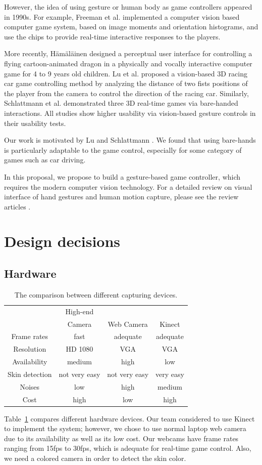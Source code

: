 \documentclass[10pt,twocolumn,letterpaper]{article}
\begin{document}
However, the idea of using gesture or human body as game
controllers appeared in 1990s. For example, 
Freeman et al. \cite{cvicg, cvfcg} implemented a computer vision based 
computer game system, based on image moments and orientation histograms, and 
use the chips to provide real-time interactive responses to the players. 

More recently, H\"{a}m\"{a}l\"{a}inen \cite{childgame} designed a perceptual user interface for
controlling a flying cartoon-animated dragon in a
physically and vocally interactive computer game for 4 to 9 years old children.
Lu et al. \cite{racecar} proposed a vision-based 3D racing car game controlling
method by analyzing the distance of two fists positions of the player
from the camera to control the direction of the racing car. Similarly, 
Schlattmann \cite{3dgames} et al. demonstrated three 3D real-time games via bare-handed 
interactions. All studies show higher usability via vision-based gesture controls 
in their usability tests.

Our work is motivated by Lu \cite{racecar} and 
Schlattmann \cite{3dgames}. We found that using bare-hands is particularly 
adaptable to the game control, especially for some category of games such as 
car driving. 

In this proposal, we propose to build a gesture-based game controller, which 
requires the modern computer vision technology. For a detailed review on visual 
interface of hand gestures and human motion capture, please see 
the review articles \cite{pamireview, cviureview}.

\section{Design decisions}
\subsection{Hardware}
\begin{table}[b!]
\begin{tabular}{c|ccc}
&High-end\\
&Camera&Web Camera&Kinect \\
\hline
Frame rates & fast & adequate & adequate \\
Resolution & HD 1080 & VGA & VGA \\
Availability & medium & high & low \\
Skin detection & not very easy & not very easy & very easy \\
Noises & low & high & medium \\
Cost & high & low & high 
\end{tabular}
\caption{The comparison between different capturing devices.}
\label{tab:hw}
\end{table}
Table~\ref{tab:hw} compares different hardware devices.
Our team considered to use Kinect to implement the system; however, 
we chose to use normal laptop web camera due to its availability as well as its 
low cost. 
Our webcams have frame rates ranging from 15fps to 30fps, which is adequate for real-time 
game control. Also, we need a colored camera in order to detect the skin color.
\end{document}

